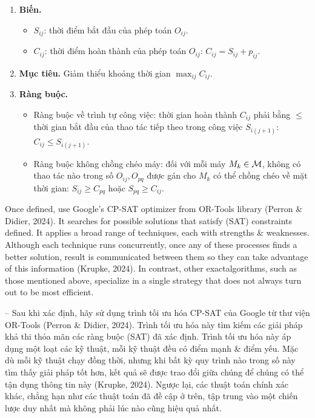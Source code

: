 \documentclass{article}
\begin{document}
\begin{itemize}
\begin{itemize}
\begin{itemize}
            \begin{enumerate}
                \item {\bf Biến.}
                \begin{itemize}
                    \item $S_{ij}$: thời điểm bắt đầu của phép toán $O_{ij}$.
                    \item $C_{ij}$: thời điểm hoàn thành của phép toán $O_{ij}$: $C_{ij} = S_{ij} + p_{ij}$.
                \end{itemize}
                \item {\bf Mục tiêu.} Giảm thiểu khoảng thời gian $\max_{ij} C_{ij}$.
                \item {\bf Ràng buộc.}
                \begin{itemize}
                    \item Ràng buộc về trình tự công việc: thời gian hoàn thành $C_{ij}$ phải bằng $\le$ thời gian bắt đầu của thao tác tiếp theo trong công việc $S_{i(j + 1)}$: $C_{ij}\le S_{i(j + 1)}$.
                    \item Ràng buộc không chồng chéo máy: đối với mỗi máy $M_k\in{\cal M}$, không có thao tác nào trong số $O_{ij}, O_{pq}$ được gán cho $M_k$ có thể chồng chéo về mặt thời gian: $S_{ij}\ge C_{pq}$ hoặc $S_{pq}\ge C_{ij}$.
                \end{itemize}
            \end{enumerate}
            Once defined, use Google's CP-SAT optimizer from OR-Tools library (Perron \& Didier, 2024). It searches for possible solutions that satisfy (SAT) constraints defined. It applies a broad range of techniques, each with strengths \& weaknesses. Although each technique runs concurrently, once any of these processes finds a better solution, result is communicated between  them so they can take advantage of this information (Krupke, 2024). In contrast, other exactalgorithms, such as those mentioned above, specialize in a single strategy that does not always turn out to be most efficient.

            -- Sau khi xác định, hãy sử dụng trình tối ưu hóa CP-SAT của Google từ thư viện OR-Tools (Perron \& Didier, 2024). Trình tối ưu hóa này tìm kiếm các giải pháp khả thi thỏa mãn các ràng buộc (SAT) đã xác định. Trình tối ưu hóa này áp dụng một loạt các kỹ thuật, mỗi kỹ thuật đều có điểm mạnh \& điểm yếu. Mặc dù mỗi kỹ thuật chạy đồng thời, nhưng khi bất kỳ quy trình nào trong số này tìm thấy giải pháp tốt hơn, kết quả sẽ được trao đổi giữa chúng để chúng có thể tận dụng thông tin này (Krupke, 2024). Ngược lại, các thuật toán chính xác khác, chẳng hạn như các thuật toán đã đề cập ở trên, tập trung vào một chiến lược duy nhất mà không phải lúc nào cũng hiệu quả nhất.


\end{itemize}
\end{itemize}
\end{itemize}
\end{document}
